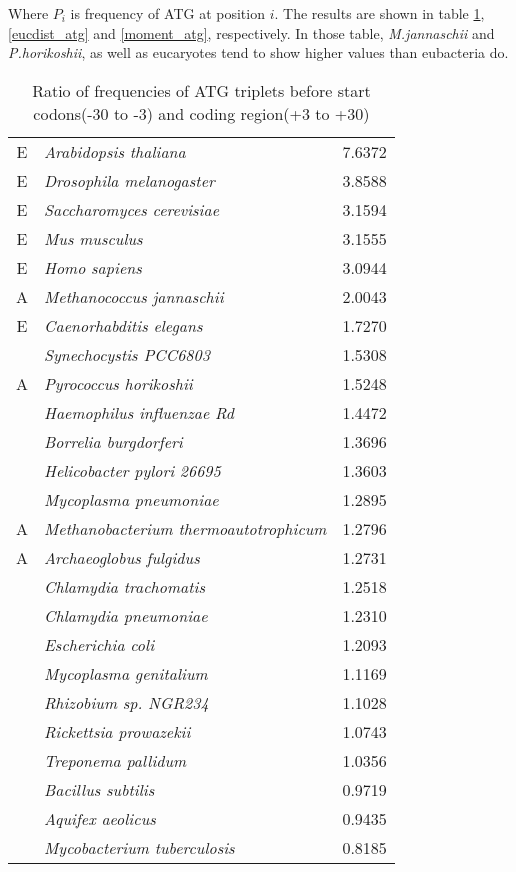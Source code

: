 Where \(P_{i}\) is frequency of ATG at position \(i\). The results are
shown in table \ref{ratio_atg}, \ref{eucdist_atg} and
\ref{moment_atg}, respectively. In those table, {\it M.jannaschii}
 and {\it P.horikoshii}, as well as eucaryotes tend to show higher
 values than eubacteria do.



\begin{table}

\begin{center}
\begin{tabular}{|c|l|r|}
E& {\it Arabidopsis thaliana   } & 7.6372 \\
E& {\it Drosophila melanogaster   } & 3.8588 \\
E& {\it Saccharomyces cerevisiae   } & 3.1594 \\
E& {\it Mus musculus   } & 3.1555 \\
E& {\it Homo sapiens   } & 3.0944 \\
A& {\it Methanococcus jannaschii   } & 2.0043 \\
E& {\it Caenorhabditis elegans   } & 1.7270 \\
& {\it Synechocystis PCC6803   } & 1.5308 \\
A& {\it Pyrococcus horikoshii   } & 1.5248 \\
& {\it Haemophilus influenzae Rd  } & 1.4472 \\
& {\it Borrelia burgdorferi   } & 1.3696 \\
& {\it Helicobacter pylori 26695  } & 1.3603 \\
& {\it Mycoplasma pneumoniae   } & 1.2895 \\
A& {\it Methanobacterium thermoautotrophicum   } & 1.2796 \\
A& {\it Archaeoglobus fulgidus   } & 1.2731 \\
& {\it Chlamydia trachomatis   } & 1.2518 \\
& {\it Chlamydia pneumoniae   } & 1.2310 \\
& {\it Escherichia coli   } & 1.2093 \\
& {\it Mycoplasma genitalium   } & 1.1169 \\
& {\it Rhizobium sp. NGR234  } & 1.1028 \\
& {\it Rickettsia prowazekii   } & 1.0743 \\
& {\it Treponema pallidum   } & 1.0356 \\
& {\it Bacillus subtilis   } & 0.9719 \\
& {\it Aquifex aeolicus   } & 0.9435 \\
& {\it Mycobacterium tuberculosis   } & 0.8185 \\
\end{tabular}
\end{center}
\caption{Ratio of frequencies of ATG triplets before start codons(-30 to -3) and coding region(+3 to +30)}
\label{ratio_atg}
\end{table}

